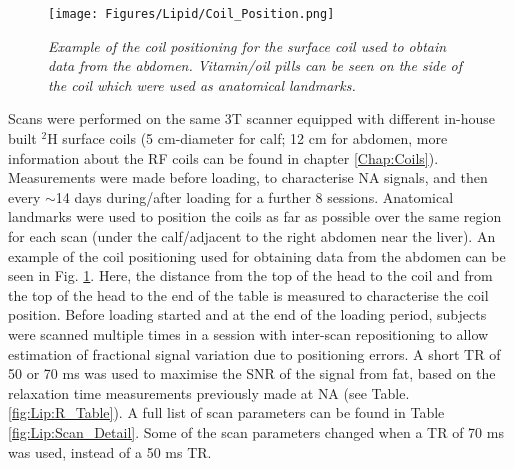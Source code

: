 \begin{figure}
    \centering
    \texttt{[image: Figures/Lipid/Coil\_Position.png]}
    \caption{\textit{Example of the coil positioning for the surface coil used to obtain data from the abdomen. Vitamin/oil pills can be seen on the side of the coil which were used as anatomical landmarks.}}
    \label{fig:Lip:Coil_Photo}
\end{figure}

Scans were performed on the same 3T scanner equipped with different in-house built $^2$H surface coils (5 cm-diameter for calf; 12 cm for abdomen, more information about the \ac{RF} coils can be found in chapter \ref{Chap:Coils}). Measurements were made before loading, to characterise \ac{NA} signals, and then every $\sim$14 days during/after loading for a further 8 sessions. Anatomical landmarks were used to position the coils as far as possible over the same region for each scan (under the calf/adjacent to the right abdomen near the liver). An example of the coil positioning used for obtaining data from the abdomen can be seen in Fig. \ref{fig:Lip:Coil_Photo}. Here, the distance from the top of the head to the coil and from the top of the head to the end of the table is measured to characterise the coil position. Before loading started and at the end of the loading period, subjects were scanned multiple times in a session with inter-scan repositioning to allow estimation of fractional signal variation due to positioning errors. A short \ac{TR} of 50 or 70 ms was used to maximise the \ac{SNR} of the signal from fat, based on the relaxation time measurements previously made at \ac{NA} (see Table. \ref{fig:Lip:R_Table}). A full list of scan parameters can be found in Table \ref{fig:Lip:Scan_Detail}. Some of the scan parameters changed when a \ac{TR} of 70 ms was used, instead of a 50 ms \ac{TR}. 



